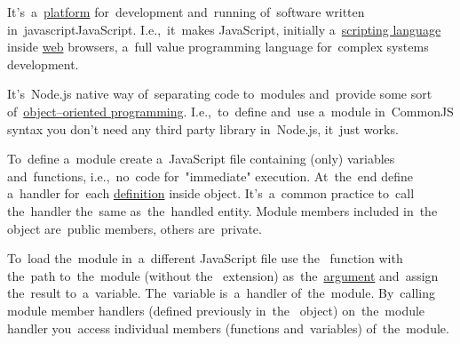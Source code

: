 \label{nodejs}
It's~a~\hyperref[platform]{platform} for~development and~running of~software written in~javascriptJavaScript.
I.e.,~it~makes JavaScript, initially a~\hyperref[scriptinglanguages]{scripting language} inside \hyperref[internetweb]{web} browsers, a~full value programming language for~complex systems development.

\label{commonjs}
It's~Node.js native way of~separating code to~modules and~provide some sort of~\hyperref[objectorientedprogramming]{object--oriented programming}.
I.e.,~to~define and~use a~module in~CommonJS syntax you don't need any third party library in~Node.js, it~just works.

To~define a~module create a~JavaScript file containing (only) variables and~functions, i.e.,~no~code for~"immediate" execution.
At~the~end define a~handler for~each \hyperref[declarationdefinition]{definition} inside  object.
It's~a~common practice to~call the~handler the~same as~the~handled entity.
Module members included in~the~ object are~public members, others are~private.

To~load the~module in~a~different JavaScript file use the~ function with the~path to~the~module (without the~ extension) as~the~\hyperref[parameterargument]{argument} and~assign the~result to~a~variable.
The~variable is~a~handler of~the~module.
By~calling module member handlers (defined previously in~the~ object) on~the~module handler you~access individual members (functions and~variables) of~the~module.

